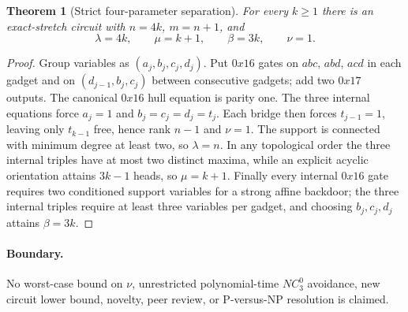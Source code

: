 \documentclass[11pt]{article}
\newtheorem{theorem}{Theorem}
\begin{document}
\begin{theorem}[Strict four-parameter separation]
For every $k\ge1$ there is an exact-stretch circuit with $n=4k$, $m=n+1$, and
\[
\lambda=4k,\qquad \mu=k+1,\qquad \beta=3k,\qquad \nu=1.
\]
\end{theorem}
\begin{proof}
Group variables as $(a_j,b_j,c_j,d_j)$. Put $0x16$ gates on $abc$, $abd$,
$acd$ in each gadget and on $(d_{j-1},b_j,c_j)$ between consecutive gadgets;
add two $0x17$ outputs. The canonical $0x16$ hull equation is parity one. The
three internal equations force $a_j=1$ and $b_j=c_j=d_j=t_j$. Each bridge then
forces $t_{j-1}=1$, leaving only $t_{k-1}$ free, hence rank $n-1$ and $\nu=1$.
The support is connected with minimum degree at least two, so $\lambda=n$. In
any topological order the three internal triples have at most two distinct
maxima, while an explicit acyclic orientation attains $3k-1$ heads, so
$\mu=k+1$. Finally every internal $0x16$ gate requires two conditioned support
variables for a strong affine backdoor; the three internal triples require at
least three variables per gadget, and choosing $b_j,c_j,d_j$ attains
$\beta=3k$.
\end{proof}

\paragraph{Boundary.}
No worst-case bound on $\nu$, unrestricted polynomial-time $NC^0_3$ avoidance,
new circuit lower bound, novelty, peer review, or P-versus-NP resolution is
claimed.
\end{document}
